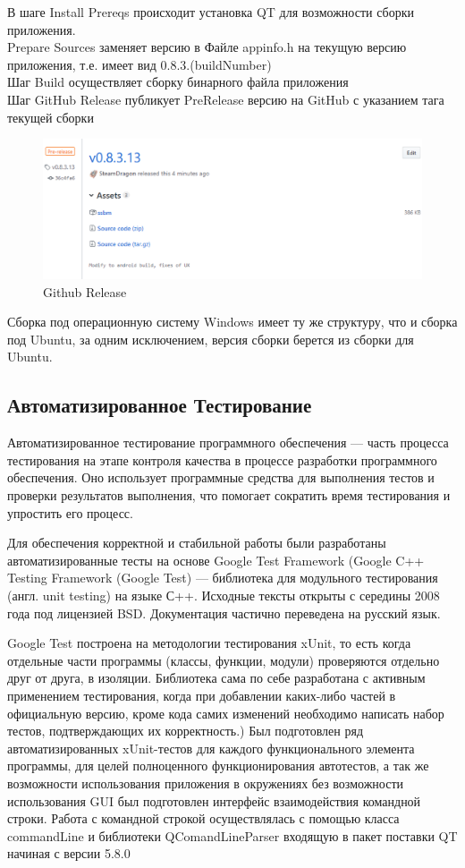 В шаге Install Prereqs происходит установка QT для возможности сборки приложения.\\
Prepare Sources заменяет версию в Файле appinfo.h на текущую версию приложения, т.е. имеет вид 0.8.3.(buildNumber)\\
Шаг Build осуществляет сборку бинарного файла приложения\\
Шаг GitHub Release публикует PreRelease версию на GitHub с указанием тага текущей сборки\\
\begin{figure}[H]
	\centering
	\includegraphics[width=1\linewidth]{pics/GHRelease.eps}
	\caption{Github Release}
	\label{fig:GHRelease}
\end{figure}
Сборка под операционную систему Windows имеет ту же структуру, что и сборка под Ubuntu, за одним исключением, версия сборки берется из сборки для Ubuntu.
\subsection{Автоматизированное Тестирование}
Автоматизированное тестирование программного обеспечения — часть процесса тестирования на этапе контроля качества в процессе разработки программного обеспечения. Оно использует программные средства для выполнения тестов и проверки результатов выполнения, что помогает сократить время тестирования и упростить его процесс. \cite{AutoTest}

Для обеспечения корректной и стабильной работы были разработаны автоматизированные тесты на основе Google Test Framework (Google C++ Testing Framework (Google Test) — библиотека для модульного тестирования (англ. unit testing) на языке С++. Исходные тексты открыты с середины 2008 года под лицензией BSD. Документация частично переведена на русский язык.

Google Test построена на методологии тестирования xUnit, то есть когда отдельные части программы (классы, функции, модули) проверяются отдельно друг от друга, в изоляции. Библиотека сама по себе разработана с активным применением тестирования, когда при добавлении каких-либо частей в официальную версию, кроме кода самих изменений необходимо написать набор тестов, подтверждающих их корректность.)\cite{GTest} Был подготовлен ряд автоматизированных xUnit-тестов для каждого функционального элемента программы, для целей полноценного функционирования автотестов, а так же возможности использования приложения в окружениях без возможности использования GUI был подготовлен интерфейс взаимодействия командной строки. Работа с командной строкой осуществлялась с помощью класса commandLine и библиотеки QComandLineParser входящую в пакет поставки QT начиная с версии 5.8.0\\

